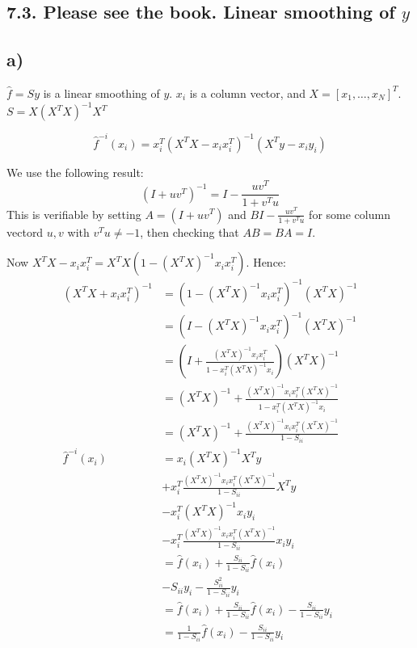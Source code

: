 \subsection*{7.3. Please see the book. Linear smoothing of $y$}
\subsection*{a)}

$\hat{f} = Sy$ is a linear smoothing of $y$. $x_i$ is a column vector, and $X = [x_1, \dots, x_N]^T$.
$S = X (X^T X)^{-1} X^T$

$$\hat{f}^{-i}(x_i) = x_i^T (X^T X - x_i x_i^T)^{-1}\left(X^T y - x_i y_i\right)  $$

We use the following result:
$$(I + uv^T)^{-1} = I - \frac{uv^T}{1 + v^Tu}$$
This is verifiable by setting $A = (I + uv^T) $ and $B  I - \frac{uv^T}{1 + v^T u}$ for some column vectord $u, v$ with $v^T u \neq -1$, then checking that $AB = BA = I$.

Now $X^T X - x_i x_i^T = X^T X ( 1 - (X^T X)^{-1} x_i x_i^T)$. Hence:
\begin{align*}
    \left( X^T X + x_i x_i^T\right) ^{-1} &= ( 1 - (X^T X)^{-1} x_i x_i^T)^{-1} (X^T X)^{-1} \\
    &= ( I - (X^T X)^{-1} x_i x_i^T)^{-1} (X^T X)^{-1} \\
    &= \left(I + \frac{(X^T X)^{-1}x_i x_i^T}{1 - x_i^T (X^T X)^{-1}x_i}\right)(X^T X)^{-1} \\
    &= (X^T X)^{-1} + \frac{(X^T X)^{-1}x_i x_i^T (X^T X)^{-1} }{1 - x_i^T (X^T X)^{-1}x_i}\\
    &= (X^T X)^{-1} + \frac{(X^T X)^{-1}x_i x_i^T (X^T X)^{-1} }{1 - S_{ii}}\\
     \hat{f}^{-i}(x_i) &=  x_i (X^T X)^{-1} X^T y\\
     &+ x_i^T \frac{(X^T X)^{-1}x_i x_i^T (X^T X)^{-1} }{1 - S_{ii}}X^T y\\
     &- x_i^T (X^T X)^{-1} x_i y_i\\
     &- x_i^T \frac{(X^T X)^{-1}x_i x_i^T (X^T X)^{-1} }{1 - S_{ii}}x_i y_i\\
     &=  \hat{f}(x_i) + \frac{S_{ii}}{1 - S_{ii}} \hat{f}(x_i)\\
     &- S_{ii} y_i - \frac{S_{ii}^2}{1 - S_{ii}} y_i\\
     &=  \hat{f}(x_i) + \frac{S_{ii}}{1 - S_{ii}} \hat{f}(x_i) - \frac{S_{ii}}{1 - S_{ii}} y_i\\
     &= \frac{1}{1 - S_{ii}} \hat{f}(x_i) - \frac{S_{ii}}{1 - S_{ii}} y_i
\end{align*}

